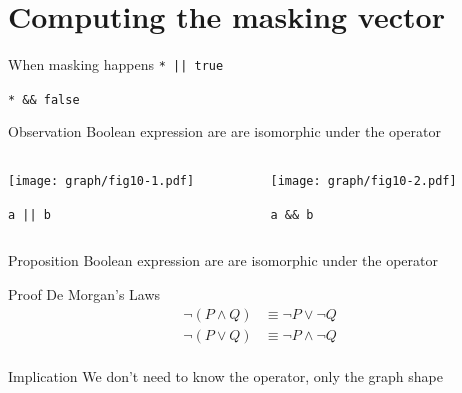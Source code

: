 \documentclass[xcolor = {dvipsnames, table}]{beamer}
\begin{document}
\section{Computing the masking vector}

\begin{frame}[fragile]
    \begin{block}{When masking happens}
        \lstinline{* || true}

        \lstinline{* && false}
    \end{block}
\end{frame}

\begin{frame}[fragile]
    \begin{block}{Observation}
        Boolean expression are are isomorphic under the operator
    \end{block}

    \begin{columns}
        \begin{column}{0.4\textwidth}
            \centering
            \texttt{[image: graph/fig10-1.pdf]}

            \lstinline{a || b}
        \end{column}
        \begin{column}{0.4\textwidth}
            \centering
            \texttt{[image: graph/fig10-2.pdf]}

            \lstinline{a && b}
        \end{column}
    \end{columns}
\end{frame}

\begin{frame}
    \begin{block}{Proposition}
        Boolean expression are are isomorphic under the operator
    \end{block}

    \begin{block}{Proof}
        De Morgan's Laws
        \begin{align*}
            \neg(P \wedge Q) & \equiv \neg P \vee \neg Q \\
            \neg(P \vee Q) & \equiv \neg P \wedge \neg Q \\
        \end{align*}
    \end{block}

    \begin{block}{Implication}
        We don't need to know the operator, only the graph shape
    \end{block}
\end{frame}
\end{document}

